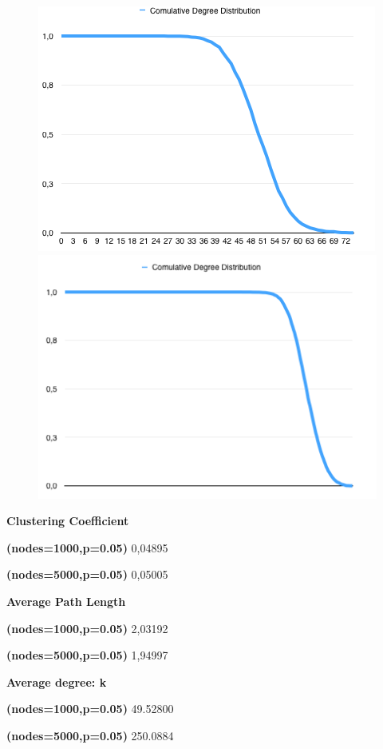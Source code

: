 \documentclass[a4paper,titlepage,11pt]{article}
\begin{document}
\begin{figure}[h]
    \centering
    \includegraphics[scale=0.50]{img/cdd-1000-05.png}
    \includegraphics[scale=0.50]{img/cdd-5000-05.png}
\end{figure}

\begin{multicols}{2}

  \textbf{Clustering Coefficient}

  \textbf{(nodes=1000,p=0.05)} 0,04895

  \textbf{(nodes=5000,p=0.05)} 0,05005

\columnbreak

  \textbf{Average Path Length}

  \textbf{(nodes=1000,p=0.05)} 2,03192

  \textbf{(nodes=5000,p=0.05)} 1,94997

\end{multicols}

\begin{center}

  \textbf{Average degree: \textlangle k\textrangle}

  \textbf{(nodes=1000,p=0.05)} 49.52800

  \textbf{(nodes=5000,p=0.05)} 250.0884

\end{center}
\end{document}
